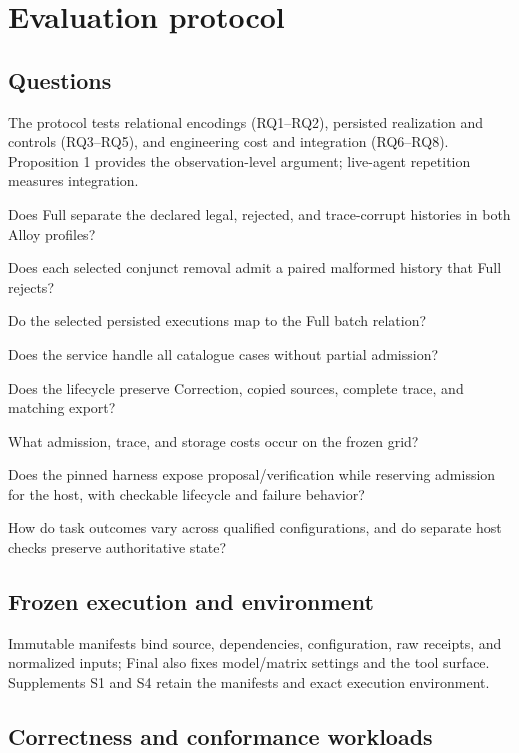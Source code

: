 \section{Evaluation protocol}
\label{sec:evaluation}

\subsection{Questions}

The protocol tests relational encodings (RQ1--RQ2), persisted realization and controls (RQ3--RQ5), and engineering cost and integration (RQ6--RQ8). Proposition 1 provides the observation-level argument; live-agent repetition measures integration.
\begin{description}[leftmargin=2.6em,labelwidth=2.1em]
\item[RQ1] Does Full separate the declared legal, rejected, and trace-corrupt histories in both Alloy profiles?
\item[RQ2] Does each selected conjunct removal admit a paired malformed history that Full rejects?
\item[RQ3] Do the selected persisted executions map to the Full batch relation?
\item[RQ4] Does the service handle all catalogue cases without partial admission?
\item[RQ5] Does the lifecycle preserve Correction, copied sources, complete trace, and matching export?
\item[RQ6] What admission, trace, and storage costs occur on the frozen grid?
\item[RQ7] Does the pinned harness expose proposal/verification while reserving admission for the host, with checkable lifecycle and failure behavior?
\item[RQ8] How do task outcomes vary across qualified configurations, and do separate host checks preserve authoritative state?
\end{description}

\subsection{Frozen execution and environment}

Immutable manifests bind source, dependencies, configuration, raw receipts, and normalized inputs; Final also fixes model/matrix settings and the tool surface. Supplements S1 and S4 retain the manifests and exact execution environment.

\subsection{Correctness and conformance workloads}

